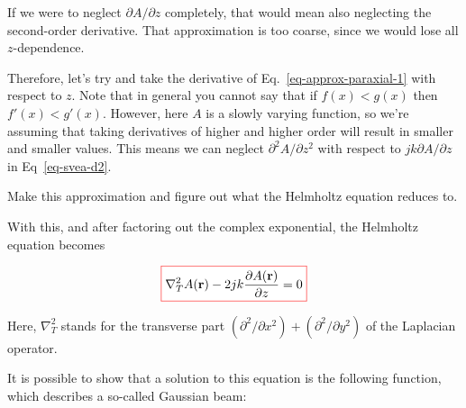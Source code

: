 If we were to neglect $\partial A / \partial z$ completely, that would mean also neglecting the second-order derivative. That approximation is too coarse, since we would lose all $z$-dependence.

Therefore, let's try and take the derivative of Eq.~\ref{eq-approx-paraxial-1} with respect to $z$. Note that in general you cannot say that if $f(x) < g(x)$ then $f'(x) < g'(x)$. However, here $A$ is a slowly varying function, so we're assuming that taking derivatives of higher and higher order will result in smaller and smaller values. This means we can neglect $\partial^2 A / \partial z^2$ with respect to $j k \partial A / \partial z$ in Eq~\ref{eq-svea-d2}. 

\begin{cue}
Make this approximation and figure out what the Helmholtz equation reduces to.
\end{cue}

With this, and after factoring out the complex exponential, the Helmholtz equation becomes

\begin{equation}
\fbox{$\displaystyle
\nabla_T^2 A({\mathbf r}) -2jk \frac{\partial A({\mathbf r})}{\partial z} = 0
$}
\label{eq-paraxial}
\end{equation} 

Here, $\nabla_T^2$ stands for the transverse part $(\partial^2 / \partial x^2) + (\partial^2 / \partial y^2)$ of the Laplacian operator.

\pagebreak

It is possible to show that a solution to this equation is the following function, which describes a so-called Gaussian beam:


